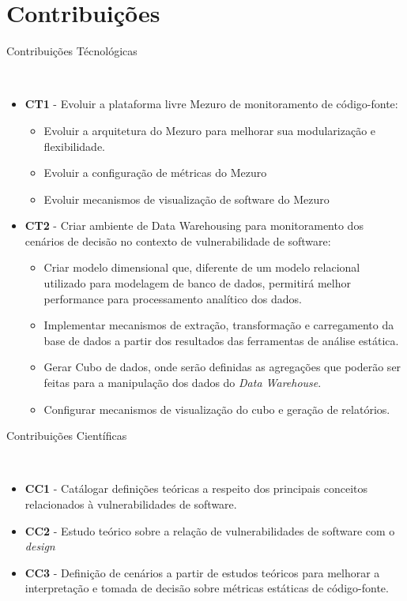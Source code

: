 \section{Contribuições}
%
\begin{description}
	\item [Contribuições Técnológicas]\
\end{description}
		\begin{itemize}
			\item \textbf{CT1} - Evoluir a plataforma livre Mezuro de monitoramento de código-fonte:
				\begin{itemize}
					\item Evoluir a arquitetura do Mezuro para melhorar sua modularização e flexibilidade.
					\item Evoluir a configuração de métricas do Mezuro
					\item Evoluir mecanismos de visualização de software do Mezuro
				\end{itemize}
			\item \textbf{CT2} - Criar ambiente de Data Warehousing para monitoramento dos cenários de decisão no contexto de vulnerabilidade de software:
	        	\begin{itemize}
	        		\item Criar modelo dimensional que, diferente de um modelo relacional utilizado para modelagem de banco de dados, permitirá melhor performance para processamento analítico dos dados.
	        		\item Implementar mecanismos de extração, transformação e carregamento da base de dados a partir dos resultados das ferramentas de análise estática.
	        		\item Gerar Cubo de dados, onde serão definidas as agregações que poderão ser feitas para a manipulação dos dados do \emph{Data Warehouse}.
					\item Configurar mecanismos de visualização do cubo e geração de relatórios.
	        	\end{itemize}
		\end{itemize}
\begin{description}
	\item [Contribuições Científicas]\
\end{description}	
	 	\begin{itemize}
			\item \textbf{CC1} - Catálogar definições teóricas a respeito dos principais conceitos relacionados à vulnerabilidades de software.
			\item \textbf{CC2} - Estudo teórico sobre a relação de vulnerabilidades de software com o \emph{design}
			\item \textbf{CC3} - Definição de cenários a partir de estudos teóricos para melhorar a interpretação e tomada de decisão sobre métricas estáticas de código-fonte.
	 	\end{itemize}

